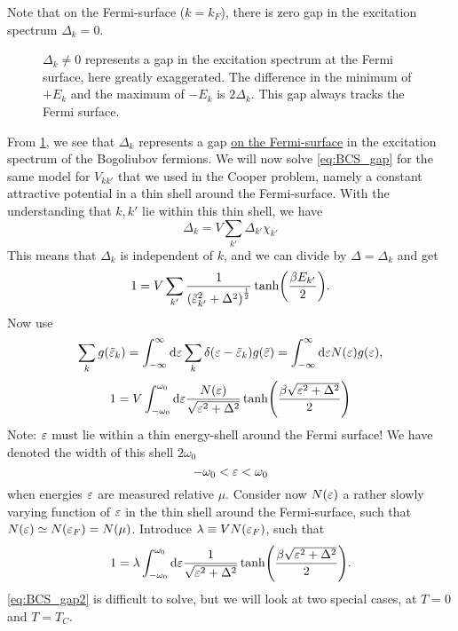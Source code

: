 Note that on the Fermi-surface ($k = k_F$), there is zero gap in the excitation spectrum $\Delta_k =0$. 
\begin{figure}
	\centering
	
	\caption{$\Delta_k \ne 0$ represents a gap in the excitation spectrum at the Fermi surface, here greatly exaggerated. The difference in the minimum of $+E_k$ and the maximum of $-E_k$ is $2\Delta_k$. This gap always tracks the Fermi surface. }
	\label{fig:BCS_gap}
\end{figure}
From \cref{fig:BCS_gap}, we see that $\Delta_k$ represents a gap \underline{on the Fermi-surface} in the excitation spectrum of the Bogoliubov fermions.
We will now solve \cref{eq:BCS_gap} for the same model for $V_{kk'}$ that we used in the Cooper problem, namely a constant attractive potential in a thin shell around the Fermi-surface. With the understanding that $k,k'$ lie within this thin shell, we have 
\begin{equation}
	\Delta_k = V\sum_{k'}\Delta_{k'}\chi_{k'}
\end{equation}
This means that $\Delta_k$ is independent of $k$, and we can divide by $\Delta =\Delta_k$ and get
\begin{equation}
	1 = V\sum_{k'}\frac{1}{\left(\tilde{\varepsilon}_{k'}^2+\Delta^2\right)^\frac12}\tanh(\frac{\beta E_{k'}}{2}).
\end{equation}
Now use 
\begin{equation}
\sum_{k}g(\tilde{\varepsilon}_k) = \int_{-\infty}^\infty\dd\varepsilon\sum_k\delta(\varepsilon-\tilde{\varepsilon}_k)g(\tilde{\varepsilon}) = \int_{-\infty}^{\infty}\dd\varepsilon N(\varepsilon)g(\varepsilon),
\end{equation}
\begin{equation}
	1 = V\int_{-\omega_0}^{\omega_0}\dd\varepsilon \frac{N(\varepsilon)}{\sqrt{\varepsilon^2 + \Delta^2}}\tanh(\frac{\beta\sqrt{\varepsilon^2+\Delta^2}}{2})
\end{equation}
Note: $\varepsilon$ must lie within a thin energy-shell around the Fermi surface! We have denoted the width of this shell $2\omega_0$ \[-\omega_0 < \varepsilon < \omega_0\]
when energies $\varepsilon$ are measured relative $\mu$. 
Consider now $N(\varepsilon)$ a rather slowly varying function of $\varepsilon$ in the thin shell around the Fermi-surface, such that $N(\varepsilon) \simeq N(\varepsilon_F) = N(\mu)$.
Introduce $\lambda \equiv V N(\varepsilon_F)$, such that 
\begin{equation}
\label{eq:BCS_gap2}
	1 = \lambda\int_{-\omega_0}^{\omega_0}\dd\varepsilon \frac{1}{\sqrt{\varepsilon^2 + \Delta^2}}\tanh(\frac{\beta\sqrt{\varepsilon^2+\Delta^2}}{2}).
\end{equation}
\cref{eq:BCS_gap2} is difficult to solve, but we will look at two special cases, at $T=0$ and $T = T_C$. 
